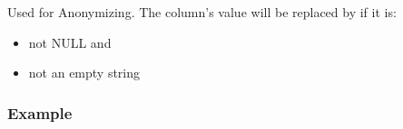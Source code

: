 \documentclass[a4paper,10pt, twoside,english]{sphinxmanual}
\begin{document}

\begin{fulllineitems}
\label{\detokenize{transformer/mapper:spooq2.transformer.mapper_custom_data_types._generate_select_expression_for_StringBoolean}}
Used for Anonymizing.
The column’s value will be replaced by  if it is:
\begin{itemize}
\item {} 
not NULL and

\item {} 
not an empty string

\end{itemize}
\subsubsection*{Example}


\end{fulllineitems}
\end{document}
